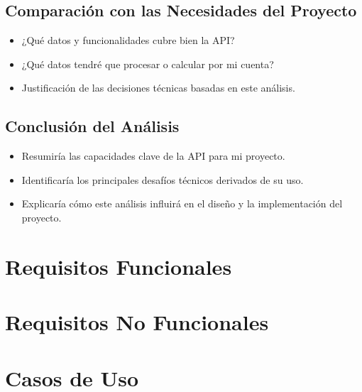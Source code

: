 \subsection{Comparación con las Necesidades del Proyecto}
\begin{itemize}
    \item ¿Qué datos y funcionalidades cubre bien la API?
    \item ¿Qué datos tendré que procesar o calcular por mi cuenta?
    \item Justificación de las decisiones técnicas basadas en este análisis.
\end{itemize}

\subsection{Conclusión del Análisis}
\begin{itemize}
    \item Resumiría las capacidades clave de la API para mi proyecto.
    \item Identificaría los principales desafíos técnicos derivados de su uso.
    \item Explicaría cómo este análisis influirá en el diseño y la implementación del proyecto.
\end{itemize}




\section{Requisitos Funcionales}

\section{Requisitos No Funcionales}

\section{Casos de Uso}